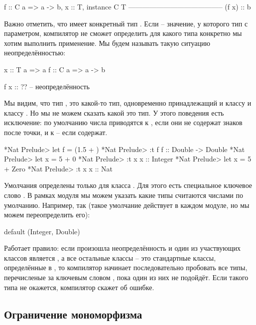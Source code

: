 \begin{code}
                    f :: C a => a -> b,  x :: T, instance C T 
                    -----------------------------------------
                                (f x) :: b
\end{code}

Важно отметить, что  имеет конкретный тип . Если  --
значение, у которого тип с параметром, компилятор не сможет определить
для какого типа конкретно мы хотим выполнить применение. Мы будем
называть такую ситуацию неопределённостью:


\begin{code}
x :: T a => a
f :: C a => a -> b

f x :: ??  -- неопределённость
\end{code}

Мы видим, что тип , это какой-то тип, одновременно принадлежащий и
классу  и классу . Но мы не можем сказать какой это тип. У
этого поведения есть исключение: по умолчанию числа приводятся к
, если они не содержат знаков после точки, и к 
-- если содержат.


\begin{code}
*Nat Prelude> let f = (1.5 + )
*Nat Prelude> :t f
f :: Double -> Double
*Nat Prelude> let x = 5 + 0
*Nat Prelude> :t x
x :: Integer
*Nat Prelude> let x = 5 + Zero
*Nat Prelude> :t x
x :: Nat
\end{code}

Умолчания определены только для класса . Для этого есть
специальное ключевое слово . В рамках модуля мы можем
указать какие типы считаются числами по умолчанию. Например, так (такое
умолчание действует в каждом модуле, но мы можем переопределить его):


\begin{code}
default (Integer, Double)
\end{code}

Работает правило: если произошла неопределённость и один из участвующих
классов является , а все остальные классы -- это стандартные
классы, определённые в , то компилятор начинает
последовательно пробовать все типы, перечисленые за ключевым словом
, пока один из них не подойдёт. Если такого типа не
окажется, компилятор скажет об ошибке.

\subsection{Ограничение мономорфизма}

